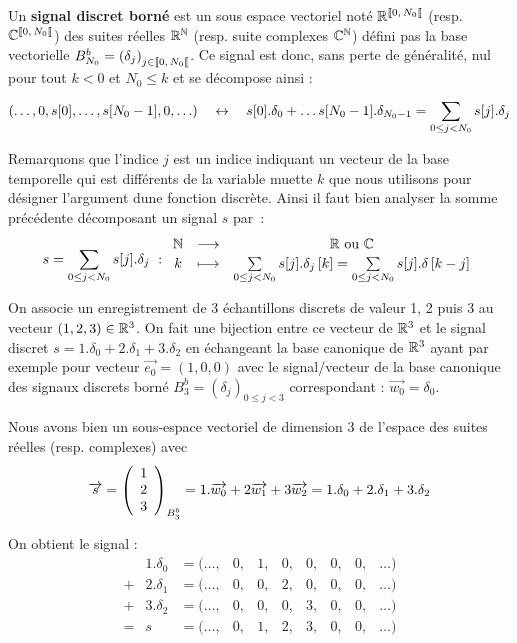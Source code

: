 \begin{definition}
  \label{def:signal_discret_borne}
  Un \textbf{signal discret borné} est un sous espace vectoriel noté
  $\RNborne$ (resp. $\CNborne$) des suites réelles $\mathbb{R}^{\mathbb{N}}$ (resp. suite
  complexes $\mathbb{C}^{\mathbb{N}}$) défini pas la base vectorielle
  $B_{N_0}^b=\left(\delta_j\right)_{j\in\SN0}$. Ce signal est donc, sans perte de
  généralité, nul pour tout $k<0$ et $ N_0\leq k$ et se décompose ainsi
  :
  \begin{equation}
    (\ldots,0, s[0], \dots, s[N_0-1], 0, \ldots) \quad \leftrightarrow \quad s[0].\delta_0 + \dots s[N_0-1].\delta_{N_0-1} = \sum\limits_{0\leq j< N_0}^{}{s[j].\delta_j}
  \end{equation}
\end{definition}

Remarquons que l'indice $j$ est un indice indiquant un vecteur de la
base temporelle qui est différents de la variable muette $k$ que nous
utilisons pour désigner l'argument dune fonction discrète. Ainsi il
faut bien analyser la somme précédente décomposant un signal $s$ par~:
\begin{equation}
  s = \sum\limits_{0\leq j< N_0}^{}{s[j].\delta_j}~: \begin{array}{ccc} \mathbb{N} & \longrightarrow & \mathbb{R} \text{ ou } \mathbb{C} \\ k & \longmapsto & \sum\limits_{0\leq j< N_0}^{}{s[j].\delta_j\left[k\right]}={\sum\limits_{0\leq j< N_0}^{}{s[j].\delta\left[k-j\right]}} \\ \end{array}
\end{equation}

\begin{exemple}
  On associe un enregistrement de 3 échantillons discrets de valeur 1,
  2 puis 3 au vecteur $(1, 2, 3)\in\mathbb{R}^3$. On fait une bijection entre
  ce vecteur de $\mathbb{R}^3$ et le signal discret
  $s=1.\delta_0+2.\delta_1+3.\delta_2$ en échangeant la base canonique
  de $\mathbb{R}^3$ ayant par exemple pour vecteur $\vec{e_0}=(1,0,0)$ avec le
  signal/vecteur de la base canonique des signaux discrets borné
  $B_3^b=\left(\delta_j\right)_{0\leq j<3}$ correspondant :
  $\vec{w_0} = \delta_0$.

  Nous avons bien un sous-espace vectoriel de dimension 3 de l'espace
  des suites réelles (resp. complexes) avec
  $$\overrightarrow{s} = \left(\begin{array}{c} {1} \\ {2} \\ {3} \end{array}\right)_{B_3^b} = 1.\overrightarrow{w_0}+2\overrightarrow{w_1}+3\overrightarrow{w_2} = 1.\delta_0+2.\delta_1+3.\delta_2$$

   On obtient le signal :
  $$
  \begin{array}{llcccccccc}
     &1.\delta_0 & =(\ldots, &0 , &1, &0, &0, &0, &0, &\ldots)\\
    +&2.\delta_1 & =(\ldots, &0 , &0, &2, &0, &0, &0, &\ldots)\\
    +&3.\delta_2 & =(\ldots, &0 , &0, &0, &3, &0, &0, &\ldots)\\\hline
    =& s  & =(\ldots, &0 , &1, &2, &3, &0, &0, &\ldots)
  \end{array}
  $$
\end{exemple}

